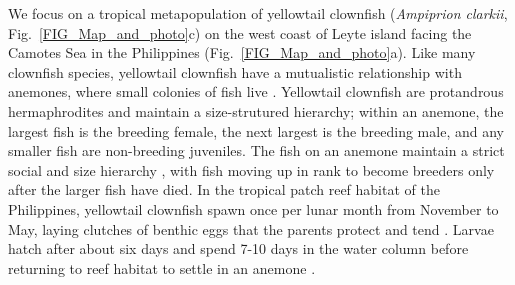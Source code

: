 \documentclass[12pt, oneside]{article}   	%
\begin{document}
We focus on a tropical metapopulation of yellowtail clownfish (\textit{Ampiprion clarkii}, Fig.\ \ref{FIG_Map_and_photo}c) on the west coast of Leyte island facing the Camotes Sea in the Philippines (Fig.\ \ref{FIG_Map_and_photo}a). Like many clownfish species, yellowtail clownfish have a mutualistic relationship with anemones, where small colonies of fish live \citep{buston2003social, fautin1992field}. Yellowtail clownfish are protandrous hermaphrodites and maintain a size-strutured hierarchy; within an anemone, the largest fish is the breeding female, the next largest is the breeding male, and any smaller fish are non-breeding juveniles. The fish on an anemone maintain a strict social and size hierarchy \citep{buston2003social}, with fish moving up in rank to become breeders only after the larger fish have died. In the tropical patch reef habitat of the Philippines, yellowtail clownfish spawn once per lunar month from November to May, laying clutches of benthic eggs that the parents protect and tend \citep{ochi1989mating, holtswarth2017fecundity}. Larvae hatch after about six days and spend 7-10 days in the water column before returning to reef habitat to settle in an anemone \citep{fautin1992field}.

\end{document}
